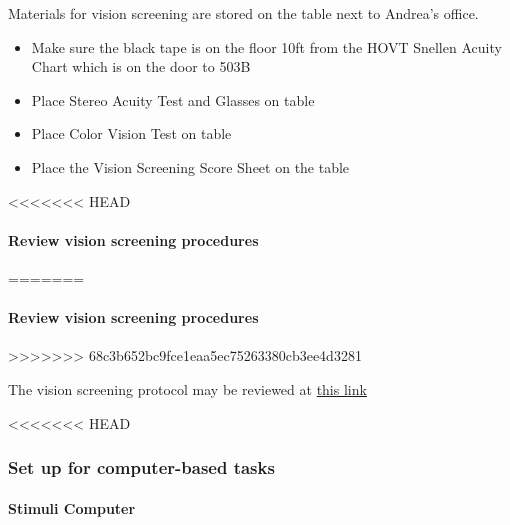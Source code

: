 \documentclass[]{article}
\providecommand{\tightlist}{%
  \setlength{\itemsep}{0pt}\setlength{\parskip}{0pt}}
\let\oldparagraph\paragraph
\renewcommand{\paragraph}[1]{\oldparagraph{#1}\mbox{}}
\begin{document}
Materials for vision screening are stored on the table next to Andrea's
office.

\begin{itemize}
\tightlist
\item
  Make sure the black tape is on the floor 10ft from the HOVT Snellen
  Acuity Chart which is on the door to 503B
\item
  Place Stereo Acuity Test and Glasses on table
\item
  Place Color Vision Test on table
\item
  Place the Vision Screening Score Sheet on the table
\end{itemize}

<<<<<<< HEAD
\paragraph{Review vision screening
procedures}\label{review-vision-screening-procedures}
=======
\hypertarget{review-vision-screening-procedures}{%
\paragraph{Review vision screening
procedures}\label{review-vision-screening-procedures}}
>>>>>>> 68c3b652bc9fce1eaa5ec75263380cb3ee4d3281

The vision screening protocol may be reviewed at
\href{vision-screening-protocol.html}{this link}

<<<<<<< HEAD
\subsubsection{Set up for computer-based
tasks}\label{set-up-for-computer-based-tasks}

\paragraph{Stimuli Computer}\label{stimuli-computer}
\end{document}
